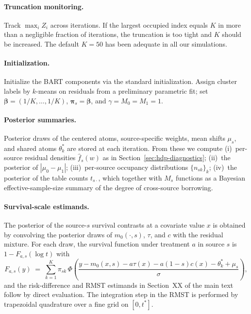 \documentclass[11pt]{article}
\theoremstyle{plain}
\theoremstyle{definition}
\theoremstyle{remark}
\newcommand{\1}{\mathds{1}}
\begin{document}
\paragraph{Truncation monitoring.} Track $\max_i Z_i$ across iterations. If the largest occupied index equals $K$ in more than a negligible fraction of iterations, the truncation is too tight and $K$ should be increased. The default $K = 50$ has been adequate in all our simulations.

\paragraph{Initialization.} Initialize the BART components via the standard \citet{chipman2010bart} initialization. Assign cluster labels by $k$-means on residuals from a preliminary parametric fit; set $\bm{\beta} = (1/K, \ldots, 1/K)$, $\bm{\pi}_s = \bm{\beta}$, and $\gamma = M_0 = M_1 = 1$.

\paragraph{Posterior summaries.} Posterior draws of the centered atoms, source-specific weights, mean shifts $\mu_s$, and shared atoms $\theta_k^*$ are stored at each iteration. From these we compute (i)~per-source residual densities $\hat f_s(w)$ as in Section~\ref{sec:hdp-diagnostics}; (ii)~the posterior of $|\mu_0 - \mu_1|$; (iii)~per-source occupancy distributions $\{n_{sk}\}_k$; (iv)~the posterior of the table counts $t_{s\cdot}$, which together with $M_s$ functions as a Bayesian effective-sample-size summary of the degree of cross-source borrowing.

\paragraph{Survival-scale estimands.} The posterior of the source-$s$ survival contrasts at a covariate value $x$ is obtained by convolving the posterior draws of $m_0(\cdot, s)$, $\tau$, and $c$ with the residual mixture. For each draw, the survival function under treatment $a$ in source $s$ is $1 - F_{a, s}(\log t)$ with
\begin{equation}
F_{a, s}(y) \;=\; \sum_{k=1}^K \pi_{sk}\, \Phi\!\left(\frac{y - m_0(x, s) - a \tau(x) - a(1 - s) c(x) - \theta_k^* + \mu_s}{\sigma}\right),
\end{equation}
and the risk-difference and RMST estimands in Section~XX of the main text follow by direct evaluation. The integration step in the RMST is performed by trapezoidal quadrature over a fine grid on $[0, t^*]$.
\end{document}
